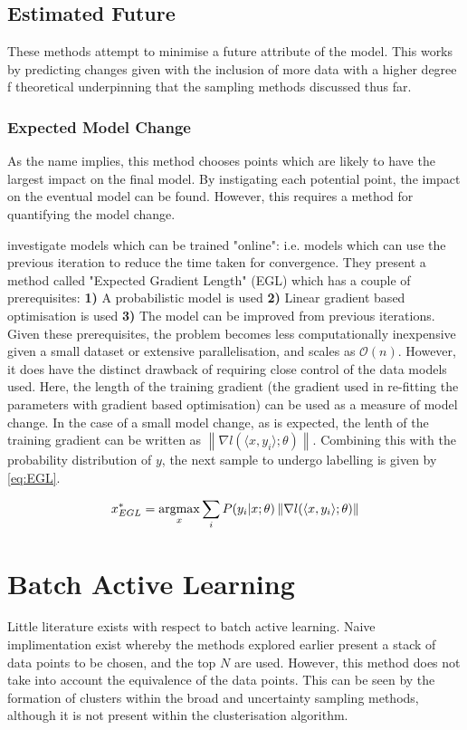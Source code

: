 \subsection{Estimated Future}
These methods attempt to minimise a future attribute of the model. This works by predicting changes given with the inclusion of more data with a higher degree f theoretical underpinning that the sampling methods discussed thus far.

\subsubsection{Expected Model Change}
As the name implies, this method chooses points which are likely to have the largest impact on the final model. By instigating each potential point, the impact on the eventual model can be found. However, this requires a method for quantifying the model change.

\textcite{Set08,Set09} investigate models which can be trained "online": i.e. models which can use the previous iteration to reduce the time taken for convergence. They present a method called "Expected Gradient Length" (EGL) which has a couple of prerequisites: \textbf{1)} A probabilistic model is used \textbf{2)} Linear gradient based optimisation is used \textbf{3)} The model can be improved from previous iterations. Given these prerequisites, the problem becomes less computationally inexpensive given a small dataset or extensive parallelisation, and scales as $\mathcal{O}(n)$. However, it does have the distinct drawback of requiring close control of the data models used. Here, the length of the training gradient (the gradient used in re-fitting the parameters with gradient based optimisation) can be used as a measure of model change. In the case of a small model change, as is expected, the lenth of the training gradient can be written as ${\left\|\nabla{}l(\langle{}x, y_i\rangle{};\theta{})\right\|}$. Combining this with the probability distribution of $y$, the next sample to undergo labelling is given by \ref{eq:EGL}.

\begin{equation}
  \label{eq:EGL}
  x_{EGL}^*=\operatorname*{argmax}_x{\sum_i{P(y_i|x;\theta{})\left\|\nabla{}l(\langle{}x, y_i\rangle{};\theta{})\right\|}}
\end{equation}


\section{Batch Active Learning}
Little literature exists with respect to batch active learning. Naive implimentation exist whereby the methods explored earlier present a stack of data points to be chosen, and the top $N$ are used. However, this method does not take into account the equivalence of the data points. This can be seen by the formation of clusters within the broad and uncertainty sampling methods, although it is not present within the clusterisation algorithm.


